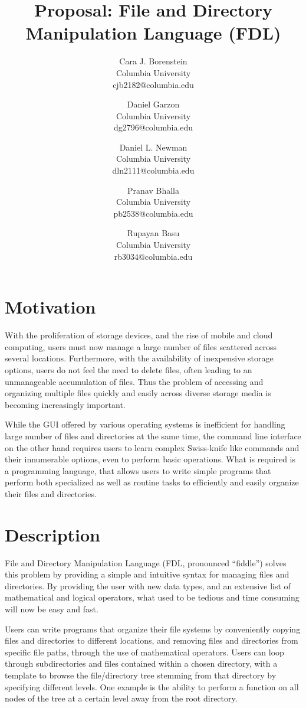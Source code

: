\documentclass[11pt]{article}
\title{\textbf{\huge Proposal: File and Directory Manipulation Language (FDL)}}
\author{
  Cara J. Borenstein\\
  Columbia University\\
  cjb2182@columbia.edu
  \and
  Daniel Garzon\\
  Columbia University\\
  dg2796@columbia.edu
  \and
  Daniel L. Newman\\
  Columbia University\\
  dln2111@columbia.edu
  \and
  Pranav Bhalla\\
  Columbia University\\
  pb2538@columbia.edu
  \and
  Rupayan Basu\\
  Columbia University\\
  rb3034@columbia.edu
}
\begin{document}
\maketitle


\section{Motivation}
With the proliferation of storage devices, and the rise of mobile and cloud computing, users must now manage a large number of files scattered across several locations. Furthermore, with the availability of inexpensive storage options, users do not feel the need to delete files, often leading to an unmanageable accumulation of files. Thus the problem of accessing and organizing multiple files quickly and easily across diverse storage media is becoming increasingly important.

While the GUI offered by various operating systems is inefficient for handling large number of files and directories at the same time, the command line interface on the other hand requires users to learn complex Swiss-knife like commands and their innumerable options, even to perform basic operations. What is required is a programming language, that allows users to write simple programs that perform both specialized as well as routine tasks to efficiently and easily organize their files and directories.

\section{Description}
File and Directory Manipulation Language (FDL, pronounced “fiddle”)  solves this problem by providing a simple and intuitive syntax for managing files and directories. By providing the user with new data types, and an extensive list of mathematical and logical operators, what used to be tedious and time consuming will now be easy and fast.

Users can write programs that organize their file systems by conveniently copying files and directories to different locations, and removing files and directories from specific file paths, through the use of mathematical operators. Users can loop through subdirectories and files contained within a chosen directory, with a template to browse the file/directory tree stemming from that directory by specifying different levels. One example is the ability to perform a function on all nodes of the tree at a certain level away from the root directory.
\end{document}
